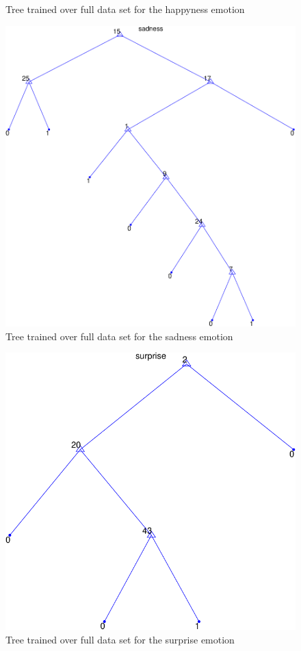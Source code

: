 \documentclass[a4paper]{article}
\begin{document}
\begin{itemize}
\begin{figure}[h]
    \caption{Tree trained over full data set for the happyness emotion}
  \end{figure}
  \begin{figure}[h]
    \centering
    \includegraphics[scale=0.5]{graph-sadness}
    \caption{Tree trained over full data set for the sadness emotion}
  \end{figure}
  \begin{figure}[h]
    \centering
    \includegraphics[scale=0.5]{graph-surprise}
    \caption{Tree trained over full data set for the surprise emotion}
  \end{figure}



\end{itemize}
\end{document}
